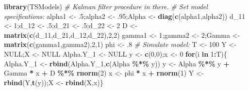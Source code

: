 \documentclass[
  12pt,
]{book}
\newenvironment{Shaded}{\begin{snugshade}}{\end{snugshade}}
\newcommand{\CommentTok}[1]{\textcolor[rgb]{0.56,0.35,0.01}{\textit{#1}}}
\newcommand{\ConstantTok}[1]{\textcolor[rgb]{0.56,0.35,0.01}{#1}}
\newcommand{\ControlFlowTok}[1]{\textcolor[rgb]{0.13,0.29,0.53}{\textbf{#1}}}
\newcommand{\DecValTok}[1]{\textcolor[rgb]{0.00,0.00,0.81}{#1}}
\newcommand{\FunctionTok}[1]{\textcolor[rgb]{0.13,0.29,0.53}{\textbf{#1}}}
\newcommand{\NormalTok}[1]{#1}
\newcommand{\OtherTok}[1]{\textcolor[rgb]{0.56,0.35,0.01}{#1}}
\newcommand{\SpecialCharTok}[1]{\textcolor[rgb]{0.81,0.36,0.00}{\textbf{#1}}}
\theoremstyle{definition}
\theoremstyle{definition}
\theoremstyle{definition}
\theoremstyle{definition}
\theoremstyle{remark}
\begin{document}
\begin{Shaded}
\begin{Highlighting}[]
\FunctionTok{library}\NormalTok{(TSModels) }\CommentTok{\# Kalman filter procedure in there.}
\CommentTok{\# Set model specifications:}
\NormalTok{alpha1 }\OtherTok{\textless{}{-}}\NormalTok{ .}\DecValTok{5}\NormalTok{;alpha2 }\OtherTok{\textless{}{-}}\NormalTok{ .}\DecValTok{95}\NormalTok{;Alpha }\OtherTok{\textless{}{-}} \FunctionTok{diag}\NormalTok{(}\FunctionTok{c}\NormalTok{(alpha1,alpha2))}
\NormalTok{d\_11 }\OtherTok{\textless{}{-}} \DecValTok{1}\NormalTok{;d\_12 }\OtherTok{\textless{}{-}}\NormalTok{ .}\DecValTok{5}\NormalTok{;d\_21 }\OtherTok{\textless{}{-}}\NormalTok{ .}\DecValTok{5}\NormalTok{;d\_22 }\OtherTok{\textless{}{-}} \DecValTok{2}
\NormalTok{D }\OtherTok{\textless{}{-}} \FunctionTok{matrix}\NormalTok{(}\FunctionTok{c}\NormalTok{(d\_11,d\_21,d\_12,d\_22),}\DecValTok{2}\NormalTok{,}\DecValTok{2}\NormalTok{)}
\NormalTok{gamma1 }\OtherTok{\textless{}{-}} \DecValTok{1}\NormalTok{;gamma2 }\OtherTok{\textless{}{-}} \DecValTok{2}\NormalTok{;Gamma }\OtherTok{\textless{}{-}} \FunctionTok{matrix}\NormalTok{(}\FunctionTok{c}\NormalTok{(gamma1,gamma2),}\DecValTok{2}\NormalTok{,}\DecValTok{1}\NormalTok{)}
\NormalTok{phi }\OtherTok{\textless{}{-}}\NormalTok{ .}\DecValTok{8}
\CommentTok{\# Simulate model:}
\NormalTok{T }\OtherTok{\textless{}{-}} \DecValTok{100}
\NormalTok{Y }\OtherTok{\textless{}{-}} \ConstantTok{NULL}\NormalTok{;X }\OtherTok{\textless{}{-}} \ConstantTok{NULL}
\NormalTok{Alpha.Y\_1 }\OtherTok{\textless{}{-}} \ConstantTok{NULL}
\NormalTok{y }\OtherTok{\textless{}{-}} \FunctionTok{c}\NormalTok{(}\DecValTok{0}\NormalTok{,}\DecValTok{0}\NormalTok{);x }\OtherTok{\textless{}{-}} \DecValTok{0}
\ControlFlowTok{for}\NormalTok{(i }\ControlFlowTok{in} \DecValTok{1}\SpecialCharTok{:}\NormalTok{T)\{}
\NormalTok{  Alpha.Y\_1 }\OtherTok{\textless{}{-}} \FunctionTok{rbind}\NormalTok{(Alpha.Y\_1,}\FunctionTok{c}\NormalTok{(Alpha }\SpecialCharTok{\%*\%}\NormalTok{ y))}
\NormalTok{  y }\OtherTok{\textless{}{-}}\NormalTok{ Alpha }\SpecialCharTok{\%*\%}\NormalTok{ y }\SpecialCharTok{+}\NormalTok{ Gamma }\SpecialCharTok{*}\NormalTok{ x }\SpecialCharTok{+}\NormalTok{ D }\SpecialCharTok{\%*\%} \FunctionTok{rnorm}\NormalTok{(}\DecValTok{2}\NormalTok{)}
\NormalTok{  x }\OtherTok{\textless{}{-}}\NormalTok{ phi }\SpecialCharTok{*}\NormalTok{ x }\SpecialCharTok{+} \FunctionTok{rnorm}\NormalTok{(}\DecValTok{1}\NormalTok{)}
\NormalTok{  Y }\OtherTok{\textless{}{-}} \FunctionTok{rbind}\NormalTok{(Y,}\FunctionTok{t}\NormalTok{(y));X }\OtherTok{\textless{}{-}} \FunctionTok{rbind}\NormalTok{(X,x)\}}

\end{Highlighting}
\end{Shaded}
\end{document}
